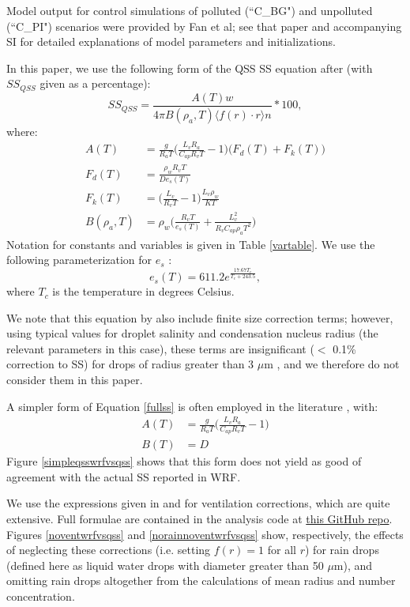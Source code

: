 \documentclass{article}
\begin{document}
Model output for control simulations of polluted (``C\_BG") and unpolluted (``C\_PI") scenarios were provided by Fan et al; see that paper and accompanying SI for detailed explanations of model parameters and initializations.

In this paper, we use the following form of the QSS SS equation after \cite{Rogers1989} (with $SS_{QSS}$ given as a percentage):
\begin{equation}
\label{fullss}
SS_{QSS} = \frac{A(T) w}{4\pi B(\rho_a, T) \langle f(r)\cdot r\rangle n}*100,
\end{equation}
where:
\begin{align}
A(T) &= \frac{g}{R_a T}\Big(\frac{L_v R_a}{C_{ap} R_v T} - 1\Big)\big(F_d(T) + F_k(T)\big)\nonumber\\
F_d(T) &= \frac{\rho_w R_v T}{D e_s(T)}\nonumber\\
F_k(T) &= \Big(\frac{L_v}{R_v T} - 1\Big)\frac{L_v \rho_w}{K T}\nonumber\\
B(\rho_a, T) &= \rho_w\Big(\frac{R_v T}{e_s(T)} + \frac{L_v^2}{R_v C_{ap} \rho_a T^2}\Big)
\end{align}
Notation for constants and variables is given in Table \ref{vartable}. We use the following parameterization for $e_s$ \cite{Rogers1989}:
\begin{equation}
e_s(T) = 611.2e^{\frac{17.67T_c}{T_c + 243.5}},
\end{equation}
where $T_c$ is the temperature in degrees Celsius.

We note that this equation by also include finite size correction terms; however, using typical values for droplet salinity and condensation nucleus radius (the relevant parameters in this case), these terms are insignificant ($<$ 0.1\% correction to SS) for drops of radius greater than 3 $\mu$m \cite{Rogers1989}, and we therefore do not consider them in this paper.

A simpler form of Equation \ref{fullss} is often employed in the literature \cite{Grabowski2020, Rogers1989}, with:
\begin{align}
A(T) &= \frac{g}{R_a T}\Big(\frac{L_v R_a}{C_{ap} R_v T} - 1\Big)\nonumber\\
B(T) &= D
\end{align}
Figure \ref{simpleqsswrfvsqss} shows that this form does not yield as good of agreement with the actual SS reported in WRF.

We use the expressions given in \cite{Pruppacher2010} and \cite{Rogers1989} for ventilation corrections, which are quite extensive. Full formulae are contained in the analysis code at \href{https://github.com/kt-latimer/20supersat}{this GitHub repo}. Figures \ref{noventwrfvsqss} and \ref{norainnoventwrfvsqss} show, respectively, the effects of neglecting these corrections (i.e. setting $f(r)=1$ for all $r$) for rain drops (defined here as liquid water drops with diameter greater than 50 $\mu$m), and omitting rain drops altogether from the calculations of mean radius and number concentration.
\end{document}
